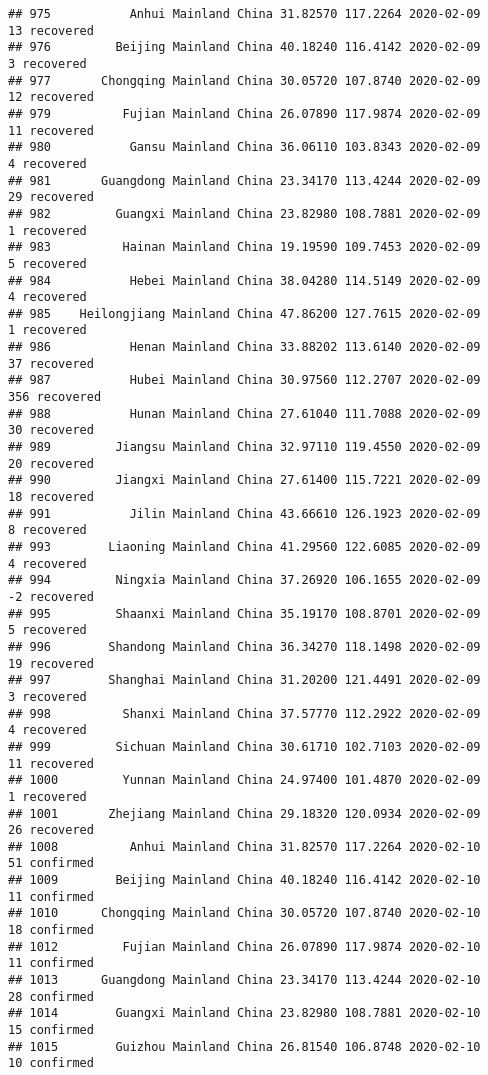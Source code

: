 \documentclass[
]{article}
\begin{document}
\begin{verbatim}
## 975           Anhui Mainland China 31.82570 117.2264 2020-02-09    13 recovered
## 976         Beijing Mainland China 40.18240 116.4142 2020-02-09     3 recovered
## 977       Chongqing Mainland China 30.05720 107.8740 2020-02-09    12 recovered
## 979          Fujian Mainland China 26.07890 117.9874 2020-02-09    11 recovered
## 980           Gansu Mainland China 36.06110 103.8343 2020-02-09     4 recovered
## 981       Guangdong Mainland China 23.34170 113.4244 2020-02-09    29 recovered
## 982         Guangxi Mainland China 23.82980 108.7881 2020-02-09     1 recovered
## 983          Hainan Mainland China 19.19590 109.7453 2020-02-09     5 recovered
## 984           Hebei Mainland China 38.04280 114.5149 2020-02-09     4 recovered
## 985    Heilongjiang Mainland China 47.86200 127.7615 2020-02-09     1 recovered
## 986           Henan Mainland China 33.88202 113.6140 2020-02-09    37 recovered
## 987           Hubei Mainland China 30.97560 112.2707 2020-02-09   356 recovered
## 988           Hunan Mainland China 27.61040 111.7088 2020-02-09    30 recovered
## 989         Jiangsu Mainland China 32.97110 119.4550 2020-02-09    20 recovered
## 990         Jiangxi Mainland China 27.61400 115.7221 2020-02-09    18 recovered
## 991           Jilin Mainland China 43.66610 126.1923 2020-02-09     8 recovered
## 993        Liaoning Mainland China 41.29560 122.6085 2020-02-09     4 recovered
## 994         Ningxia Mainland China 37.26920 106.1655 2020-02-09    -2 recovered
## 995         Shaanxi Mainland China 35.19170 108.8701 2020-02-09     5 recovered
## 996        Shandong Mainland China 36.34270 118.1498 2020-02-09    19 recovered
## 997        Shanghai Mainland China 31.20200 121.4491 2020-02-09     3 recovered
## 998          Shanxi Mainland China 37.57770 112.2922 2020-02-09     4 recovered
## 999         Sichuan Mainland China 30.61710 102.7103 2020-02-09    11 recovered
## 1000         Yunnan Mainland China 24.97400 101.4870 2020-02-09     1 recovered
## 1001       Zhejiang Mainland China 29.18320 120.0934 2020-02-09    26 recovered
## 1008          Anhui Mainland China 31.82570 117.2264 2020-02-10    51 confirmed
## 1009        Beijing Mainland China 40.18240 116.4142 2020-02-10    11 confirmed
## 1010      Chongqing Mainland China 30.05720 107.8740 2020-02-10    18 confirmed
## 1012         Fujian Mainland China 26.07890 117.9874 2020-02-10    11 confirmed
## 1013      Guangdong Mainland China 23.34170 113.4244 2020-02-10    28 confirmed
## 1014        Guangxi Mainland China 23.82980 108.7881 2020-02-10    15 confirmed
## 1015        Guizhou Mainland China 26.81540 106.8748 2020-02-10    10 confirmed

\end{verbatim}
\end{document}
